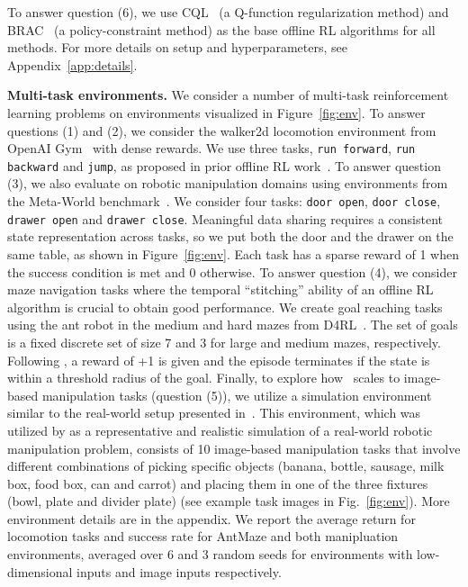 To answer question (6), we use CQL~\citep{kumar2020conservative} (a Q-function regularization method) and BRAC~\citep{wu2019behavior} (a policy-constraint method) as the base offline RL algorithms for all methods.  For more details on setup and hyperparameters, see Appendix~\ref{app:details}.


\textbf{Multi-task environments.} We consider a number of multi-task reinforcement learning problems on environments visualized in Figure~\ref{fig:env}. 
{To answer questions (1) and (2), we consider the walker2d locomotion environment from OpenAI Gym~\citep{brockman2016openai} with dense rewards. We use three tasks, \texttt{run forward}, \texttt{run backward} and \texttt{jump}, as proposed in prior offline RL work~\citep{yu2020mopo}.}
To answer question (3), we also evaluate on robotic manipulation domains using environments from the Meta-World benchmark~\citep{yu2020metaworld}. We consider four tasks: \texttt{door open}, \texttt{door close}, \texttt{drawer open} and \texttt{drawer close}. Meaningful data sharing requires a consistent state representation across tasks, so we put both the door and the drawer on the same table, as shown in Figure~\ref{fig:env}. Each task has a sparse reward of 1 when the success condition is met and 0 otherwise. To answer question (4), we consider maze navigation tasks where the temporal ``stitching'' ability of an offline RL algorithm is crucial to obtain good performance. We create goal reaching tasks using the ant robot in the medium and hard mazes from D4RL~\citep{fu2020d4rl}. The set of goals is a fixed discrete set of size 7 and 3 for large and medium mazes, respectively. Following \citet{fu2020d4rl}, a reward of +1 is given and the episode terminates if the state is within a threshold radius of the goal. Finally, to explore how \cdsmethodname\ scales to image-based manipulation tasks (question (5)), we utilize a simulation environment similar to the real-world setup presented in~\citep{kalashnikov2021mt}. This environment, which was utilized by \citet{kalashnikov2021mt} as a representative and realistic simulation of a real-world robotic manipulation problem, consists of 10 image-based manipulation tasks that involve different combinations of picking specific objects (banana, bottle, sausage, milk box, food box, can and carrot) and placing them in one of the three fixtures (bowl, plate and divider plate) (see example task images in Fig.~\ref{fig:env}).
More environment details are in the appendix. We report the average return for locomotion tasks and success rate for AntMaze and both manipluation environments, averaged over 6 and 3 random seeds for environments with low-dimensional inputs and image inputs respectively.

